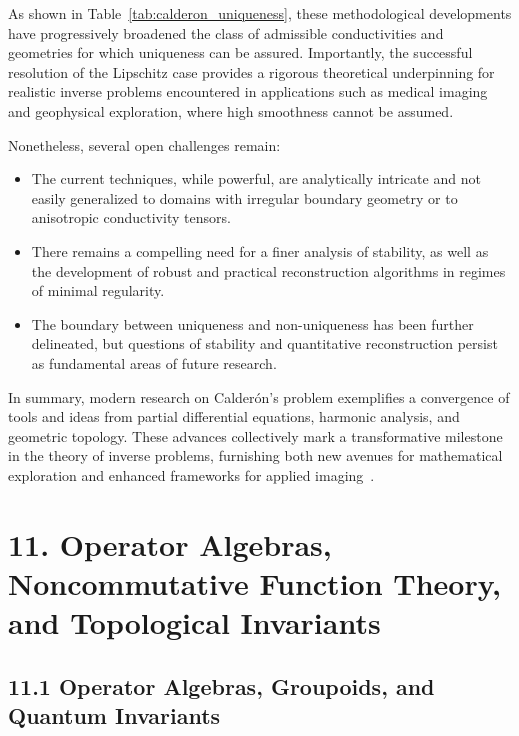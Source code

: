 \documentclass[11pt]{article}
\begin{document}
As shown in Table~\ref{tab:calderon_uniqueness}, these methodological developments have progressively broadened the class of admissible conductivities and geometries for which uniqueness can be assured. Importantly, the successful resolution of the Lipschitz case provides a rigorous theoretical underpinning for realistic inverse problems encountered in applications such as medical imaging and geophysical exploration, where high smoothness cannot be assumed.

Nonetheless, several open challenges remain:

\begin{itemize}
    \item The current techniques, while powerful, are analytically intricate and not easily generalized to domains with irregular boundary geometry or to anisotropic conductivity tensors.
    \item There remains a compelling need for a finer analysis of stability, as well as the development of robust and practical reconstruction algorithms in regimes of minimal regularity.
    \item The boundary between uniqueness and non-uniqueness has been further delineated, but questions of stability and quantitative reconstruction persist as fundamental areas of future research.
\end{itemize}

In summary, modern research on Calderón's problem exemplifies a convergence of tools and ideas from partial differential equations, harmonic analysis, and geometric topology. These advances collectively mark a transformative milestone in the theory of inverse problems, furnishing both new avenues for mathematical exploration and enhanced frameworks for applied imaging~\cite{ref102}.

\section{11. Operator Algebras, Noncommutative Function Theory, and Topological Invariants}

\subsection{11.1 Operator Algebras, Groupoids, and Quantum Invariants}
\end{document}
